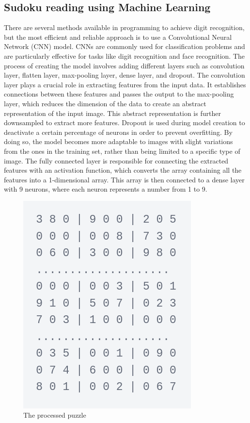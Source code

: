 \documentclass[conference]{IEEEtran}
\begin{document}
\subsection{Sudoku reading using Machine Learning}
There are several methods available in programming to achieve digit recognition, but the most efficient and reliable approach is to use a Convolutional Neural Network (CNN) model. CNNs are commonly used for classification problems and are particularly effective for tasks like digit recognition and face recognition. The process of creating the model involves adding different layers such as convolution layer, flatten layer, max-pooling layer, dense layer, and dropout. The convolution layer plays a crucial role in extracting features from the input data. It establishes connections between these features and passes the output to the max-pooling layer, which reduces the dimension of the data to create an abstract representation of the input image. This abstract representation is further downsampled to extract more features. Dropout is used during model creation to deactivate a certain percentage of neurons in order to prevent overfitting. By doing so, the model becomes more adaptable to images with slight variations from the ones in the training set, rather than being limited to a specific type of image. The fully connected layer is responsible for connecting the extracted features with an activation function, which converts the array containing all the features into a 1-dimensional array. This array is then connected to a dense layer with 9 neurons, where each neuron represents a number from 1 to 9. 

\begin{figure}[htbp]
\centerline{\includegraphics[scale=0.5]{assets/processed.png}}
\caption{The processed puzzle}
\label{processed_puzzle}
\end{figure}
\end{document}
